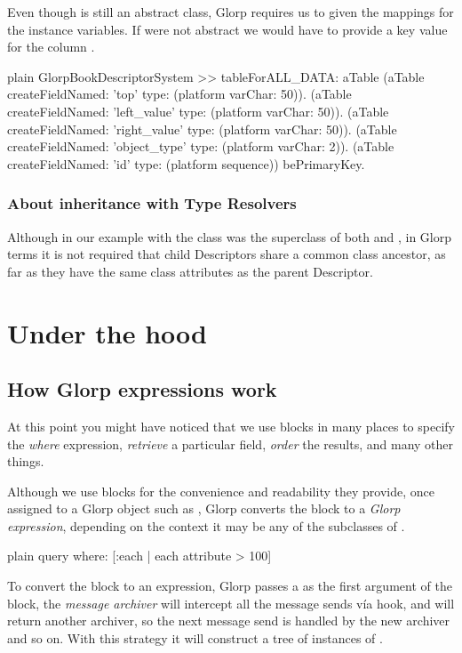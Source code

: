 \documentclass[10pt,twoside,english]{_support/latex/sbabook/sbabook}
\begin{document}
Even though  is still an abstract class, Glorp requires us to given
the mappings for the  instance variables. If  were not abstract
we would have to provide a key value for the column .

\begin{displaycode}{plain}
GlorpBookDescriptorSystem >> tableForALL_DATA: aTable
	(aTable createFieldNamed: 'top' type: (platform varChar: 50)).
	(aTable createFieldNamed: 'left_value' type: (platform varChar: 50)).
	(aTable createFieldNamed: 'right_value' type: (platform varChar: 50)).
	(aTable createFieldNamed: 'object_type' type: (platform varChar: 2)).
	(aTable createFieldNamed: 'id' type: (platform sequence)) bePrimaryKey.
\end{displaycode}
\subsection{About inheritance with Type Resolvers}
Although in our example with the class  was the superclass of both
 and , in Glorp terms it is not required that
child Descriptors share a common class ancestor, as far as they have the same
class attributes as the parent Descriptor.
\chapter{Under the hood}\section{How Glorp expressions work}
At this point you might have noticed that we use blocks in many places
to specify the \textit{where} expression, \textit{retrieve} a particular field, \textit{order}
the results, and many other things. 

Although we use blocks for the convenience and readability they provide, once assigned to a Glorp object such as 
, Glorp converts the block to a \textit{Glorp expression}, depending
on the context it may be any of the subclasses of .

\begin{displaycode}{plain}
query where: [:each | each attribute > 100]
\end{displaycode}

To convert the block to an expression, Glorp passes a  as the
first argument of the block, the \textit{message archiver} will intercept all the message sends v\'{i}a  hook,
and will return another archiver, so the next message send is handled by the
new archiver and so on. With this strategy it will construct a tree
of instances of .
\end{document}
